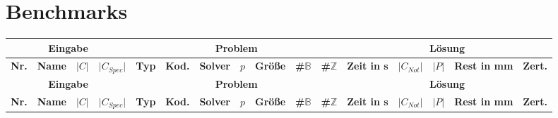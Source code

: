 \section{Benchmarks}
\begin{landscape}
    \begin{longtable}{|c|c|c|c|c|l|c|c|c|c|c|c|c|c|c|c|}
            \hline
            \multicolumn{4}{|c|}{\textbf{Eingabe}} & \multicolumn{7}{c|}{\textbf{Problem}} & \multicolumn{5}{c|}{\textbf{Lösung}} \\
            \hline
            \textbf{Nr.} & \textbf{Name} & \textbf{$\lvert C \rvert$} & \textbf{$\lvert C_{Spec} \rvert$} & \textbf{Typ} & \textbf{Kod.} & \textbf{Solver} & \textbf{$p$} & \textbf{Größe} & \textbf{\#$\mathbb{B}$} & \textbf{\#$\mathbb{Z}$} & \textbf{Zeit in s} & \textbf{$\lvert C_{Not} \rvert$} & \textbf{$\lvert P \rvert$} & \textbf{Rest in mm} & \textbf{Zert.} \\
            \hline
            \endfirsthead

            \hline
            \multicolumn{4}{|c|}{\textbf{Eingabe}} & \multicolumn{7}{c|}{\textbf{Problem}} & \multicolumn{5}{c|}{\textbf{Lösung}} \\
            \hline
            \textbf{Nr.} & \textbf{Name} & \textbf{$\lvert C \rvert$} & \textbf{$\lvert C_{Spec} \rvert$} & \textbf{Typ} & \textbf{Kod.} & \textbf{Solver} & \textbf{$p$} & \textbf{Größe} & \textbf{\#$\mathbb{B}$} & \textbf{\#$\mathbb{Z}$} & \textbf{Zeit in s} & \textbf{$\lvert C_{Not} \rvert$} & \textbf{$\lvert P \rvert$} & \textbf{Rest in mm} & \textbf{Zert.} \\
            \hline
            \endhead


\end{longtable}
\end{landscape}

